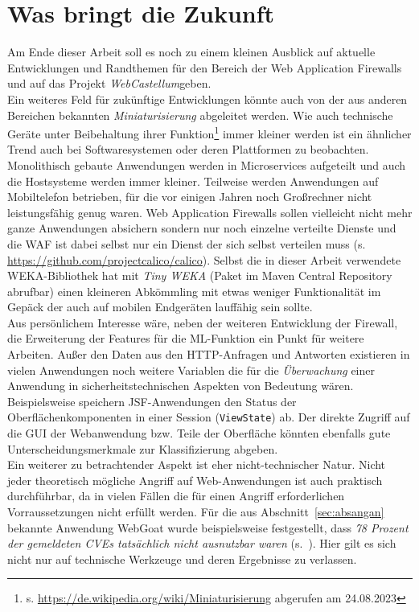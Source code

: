 \section{Was bringt die Zukunft}

Am Ende dieser Arbeit soll es noch zu einem kleinen Ausblick auf aktuelle Entwicklungen und Randthemen für den Bereich der Web Application Firewalls und auf das Projekt \glqq\emph{WebCastellum}\grqq geben.\\


Ein weiteres Feld für zukünftige Entwicklungen könnte auch von der aus anderen Bereichen bekannten \emph{Miniaturisierung} abgeleitet werden. Wie auch technische Geräte unter Beibehaltung ihrer Funktion\footnote{s. \url{https://de.wikipedia.org/wiki/Miniaturisierung} abgerufen am 24.08.2023} immer kleiner werden ist ein ähnlicher Trend auch bei Softwaresystemen oder deren Plattformen zu beobachten. Monolithisch gebaute Anwendungen werden in Microservices aufgeteilt und auch die Hostsysteme werden immer kleiner. Teilweise werden Anwendungen auf Mobiltelefon betrieben, für die vor einigen Jahren noch Großrechner nicht leistungsfähig genug waren. Web Application Firewalls sollen vielleicht nicht mehr ganze Anwendungen absichern sondern nur noch einzelne verteilte Dienste und die WAF ist dabei selbst nur ein Dienst der sich selbst verteilen muss (s. \url{https://github.com/projectcalico/calico}). Selbst die in dieser Arbeit verwendete WEKA-Bibliothek hat mit \emph{Tiny WEKA} (Paket im Maven Central Repository abrufbar) einen kleineren Abkömmling mit etwas weniger Funktionalität im Gepäck der auch auf mobilen Endgeräten lauffähig sein sollte.\\

Aus persönlichem Interesse wäre, neben der weiteren Entwicklung der Firewall, die Erweiterung der Features für die ML-Funktion ein Punkt für weitere Arbeiten. Außer den Daten aus den HTTP-Anfragen und Antworten existieren in vielen Anwendungen noch weitere Variablen die für die \emph{Überwachung} einer Anwendung in sicherheitstechnischen Aspekten von Bedeutung wären. Beispielsweise speichern JSF-Anwendungen den Status der Oberflächenkomponenten in einer Session (\verb=ViewState=) ab. Der direkte Zugriff auf die GUI der Webanwendung bzw. Teile der Oberfläche könnten ebenfalls gute Unterscheidungsmerkmale zur Klassifizierung abgeben.\\

Ein weiterer zu betrachtender Aspekt ist eher nicht-technischer Natur. Nicht jeder theoretisch mögliche Angriff auf Web-Anwendungen ist auch praktisch durchführbar, da in vielen Fällen die für einen Angriff erforderlichen Vorraussetzungen nicht erfüllt werden. Für die aus Abschnitt~\ref{sec:absangan} bekannte Anwendung WebGoat wurde beispielsweise festgestellt, dass \glqq\emph{78 Prozent der gemeldeten CVEs tatsächlich nicht ausnutzbar waren}\grqq{} (s.~\cite{lueck23}). Hier gilt es sich nicht nur auf technische Werkzeuge und deren Ergebnisse zu verlassen.\\

